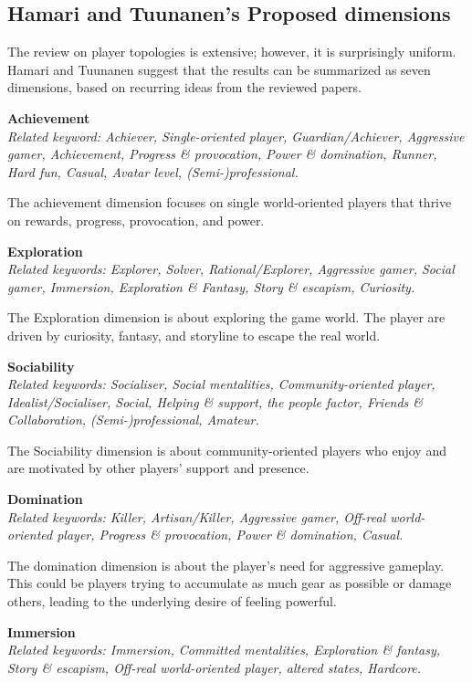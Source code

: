 \subsection{Hamari and Tuunanen’s Proposed dimensions}
The review on player topologies is extensive; however, it is surprisingly uniform. Hamari and Tuunanen suggest that the results can be summarized as seven dimensions, based on recurring ideas from the reviewed papers.

\textbf{Achievement}\\
\textit{Related keyword: Achiever, Single-oriented player, Guardian/Achiever, Aggressive gamer, Achievement, Progress \& provocation, Power \& domination, Runner, Hard fun, Casual, Avatar level, (Semi-)professional.}

The achievement dimension focuses on single world-oriented players that thrive on rewards, progress, provocation, and power. 
    
\textbf{Exploration}\\
\textit{Related keywords: Explorer, Solver, Rational/Explorer, Aggressive gamer, Social gamer, Immersion, Exploration \& Fantasy, Story \& escapism, Curiosity.}

The Exploration dimension is about exploring the game world. The player are driven by curiosity, fantasy, and storyline to escape the real world.
    
\textbf{Sociability}\\
\textit{Related keywords: Socialiser, Social mentalities, Community-oriented player, Idealist/Socialiser, Social, Helping \& support, the people factor, Friends \& Collaboration, (Semi-)professional, Amateur.}

The Sociability dimension is about community-oriented players who enjoy and are motivated by other players’ support and presence. 
    
\textbf{Domination}\\
\textit{Related keywords: Killer, Artisan/Killer, Aggressive gamer, Off-real world-oriented player, Progress \& provocation, Power \& domination, Casual.}

The domination dimension is about the player’s need for aggressive gameplay. This could be players trying to accumulate as much gear as possible or damage others, leading to the underlying desire of feeling powerful.

\textbf{Immersion}\\
\textit{Related keywords: Immersion, Committed mentalities, Exploration \& fantasy, Story \& escapism, Off-real world-oriented player, altered states, Hardcore.}

